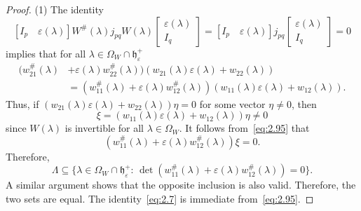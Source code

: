 \documentclass[12pt,twoside,a4paper]{amsart}
\theoremstyle{definition}
\numberwithin{equation}{section}
\begin{document}
\begin{proof}
(1) The identity
\[
[I_p\quad \varepsilon(\lambda)]W^\#(\lambda)j_{pq}W(\lambda)
\begin{bmatrix} \varepsilon(\lambda)\\ I_q\end{bmatrix}=
[I_p\quad \varepsilon(\lambda)]j_{pq}
\begin{bmatrix} \varepsilon(\lambda)\\ I_q\end{bmatrix}=0
\]
implies that for all $\lambda\in\Omega_W\cap {{\mathfrak h}}_\varepsilon^+$
\begin{equation}\label{eq:2.95}
\begin{split}
(w_{21}^\#(\lambda)&+\varepsilon(\lambda)
w_{22}^\#(\lambda))(w_{21}(\lambda)\varepsilon(\lambda)+w_{22}(\lambda))\\
&=(w_{11}^\#(\lambda)+\varepsilon(\lambda)
w_{12}^\#(\lambda))(w_{11}(\lambda)\varepsilon(\lambda)+w_{12}(\lambda)).
\end{split}
\end{equation}
Thus, if
$
(w_{21}(\lambda)\varepsilon(\lambda)+w_{22}(\lambda))\eta=0 $ for
some vector $\eta\neq 0$, then
\begin{equation}\label{eq:2.95a}
\xi=(w_{11}(\lambda)\varepsilon(\lambda)+w_{12}(\lambda))\eta\neq 0
\end{equation}
since $W(\lambda)$ is invertible for all $\lambda\in\Omega_W$. It
follows from~\eqref{eq:2.95} that
\begin{equation}\label{eq:2.95b}
(w_{11}^\#(\lambda)+\varepsilon(\lambda) w_{12}^\#(\lambda))\xi=0.
\end{equation}
Therefore,
\[
\Lambda\subseteq\{\lambda\in \Omega_W\cap {{\mathfrak h}}_\varepsilon^+:\,
\det(w_{11}^\#(\lambda)+
\varepsilon(\lambda)w_{12}^\#(\lambda))=0\}.
\]
A similar argument shows that the opposite inclusion is also
valid. Therefore, the two sets are equal.   The
identity~\eqref{eq:2.7} is immediate from~\eqref{eq:2.95}.


\end{proof}
\end{document}
